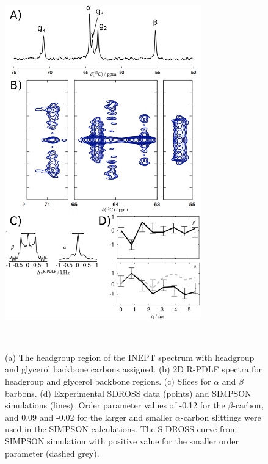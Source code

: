 \documentclass[aps,prl,superscriptaddress,twocolumn]{revtex4}
\begin{document}
\begin{figure}[!htb]
  \centering
  \includegraphics[width=8.5cm]{../scratch/figIDEA.eps}
  \caption{\label{PShgSIGNSsimpson}
    (a) The headgroup region of the INEPT spectrum with headgroup and glycerol backbone carbons assigned.
    (b) 2D R-PDLF spectra for headgroup and glycerol backbone regions.
    (c) Slices for $\alpha$ and $\beta$ barbons.
    (d) Experimental SDROSS data (points) and SIMPSON simulations (lines).
    Order parameter values of -0.12 for the $\beta$-carbon, and 0.09 and -0.02
    for the larger and smaller $\alpha$-carbon slittings were used in the
    SIMPSON calculations. The S-DROSS curve from SIMPSON simulation with positive value
    for the smaller order parameter (dashed grey).
  }
   \\
\end{figure}

\end{document}
